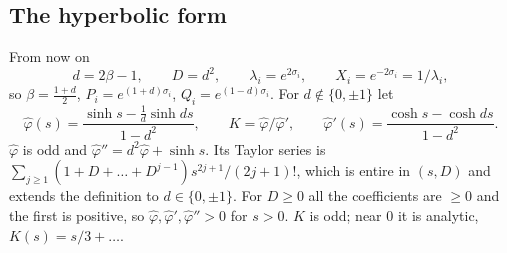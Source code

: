 \documentclass[11pt]{amsart}
\theoremstyle{definition}
\numberwithin{equation}{section}
\newcommand{\ph}{\hat\varphi}
\begin{document}
\subsection*{The hyperbolic form} From now on
\[d=2\beta-1,\qquad D=d^2,\qquad \lambda_i=e^{2\sigma_i},\qquad X_i=e^{-2\sigma_i}=1/\lambda_i,\]
so $\beta=\frac{1+d}2$, $P_i=e^{(1+d)\sigma_i}$, $Q_i=e^{(1-d)\sigma_i}$. For $d\notin\{0,\pm1\}$ let
\begin{equation}
\ph(s)=\frac{\sinh s-\frac1d\sinh ds}{1-d^2},\qquad K=\ph/\ph',\qquad \ph'(s)=\frac{\cosh s-\cosh ds}{1-d^2}.
\end{equation}
$\ph$ is odd and $\ph''=d^2\ph+\sinh s$. Its Taylor series is $\sum_{j\ge1}(1+D+\dots+D^{j-1})s^{2j+1}/(2j+1)!$, which is entire in $(s,D)$ and extends the definition to $d\in\{0,\pm1\}$. For $D\ge0$
all the coefficients are $\ge0$ and the first is positive, so $\ph,\ph',\ph''>0$ for $s>0$. $K$ is odd; near $0$ it is analytic, $K(s)=s/3+\dots$.
\end{document}
